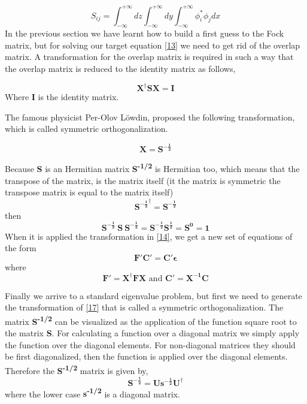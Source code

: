 \documentclass{tmr}
\newcommand{\inftyint}{\int_{-\infty}^{+\infty}}
\begin{document}
\begin{equation}\label{16}
S_{ij} = \inftyint {dz \inftyint {dy \inftyint {\phi^{*}_{i} \phi_{j}dx}}} 
\end{equation}
In the previous section we have learnt how to build a first guess to the Fock matrix,
but for solving our target equation \eqref{13} we need to get rid of the overlap matrix.
A transformation for the overlap matrix is required in such a way that the overlap matrix
is reduced to the identity matrix as follows,

\begin{equation}\label{17}
 \mathbf{X^{\dagger}SX} = \mathbf{I}
\end{equation}
Where \textbf{I} is the identity matrix. 

\par The famous physicist Per-Olov L\"owdin, proposed the following transformation,
which is called symmetric orthogonalization.

\begin{equation}\label{18}
\mathbf{X} = \mathbf{S^{-\frac{1}{2}}} 
\end{equation}

Because \textbf{S} is an Hermitian matrix  \textbf{S\textsuperscript{-1/2}} is Hermitian too,
which means that the transpose of the matrix, is the matrix itself (it the matrix is
symmetric the transpose matrix is equal to the matrix itself)
\[ \mathbf{{S^{-\frac{1}{2}}}^{\dagger}} = \mathbf{S^{-\frac{1}{2}}} \]
then
\[ \mathbf{S^{-\frac{1}{2}}\ S\ S^{-\frac{1}{2}}} =  \mathbf{S^{-\frac{1}{2}} S^{\frac{1}{2}}}
= \mathbf{S^0} = \mathbf{1}
\]
When it is applied the transformation in \eqref{14},
we get a new set of equations of the form
\begin{equation}\label{19}
\mathbf{F'C'} = \mathbf{C'\epsilon} 
\end{equation}
where 
\begin{equation}\label{20}
\mathbf{F'} = \mathbf{X^{\dagger}FX} \text{ and }  \mathbf{C'} = \mathbf{X^{-1}C}
\end{equation}

Finally we arrive to a standard eigenvalue problem, but first we need to generate
the transformation of \eqref{17} that is called a symmetric orthogonalization. The
matrix \textbf{S\textsuperscript{-1/2}} can be visualized as the application of the 
function square root to the matrix \textbf{S}. For calculating a
function over a diagonal matrix we simply apply the function
over the diagonal elements. For non-diagonal matrices they should be first diagonalized, then
the function is applied over the diagonal elements. Therefore the \textbf{S\textsuperscript{-1/2}}
matrix is given by,
\begin{equation}\label{21}
\mathbf{S^{-\frac{1}{2}}} = \mathbf{U{s^{-\frac{1}{2}}}U^{\dagger}}
\end{equation}
where the lower case \textbf{s\textsuperscript{-1/2}} is a diagonal matrix. 
\end{document}
